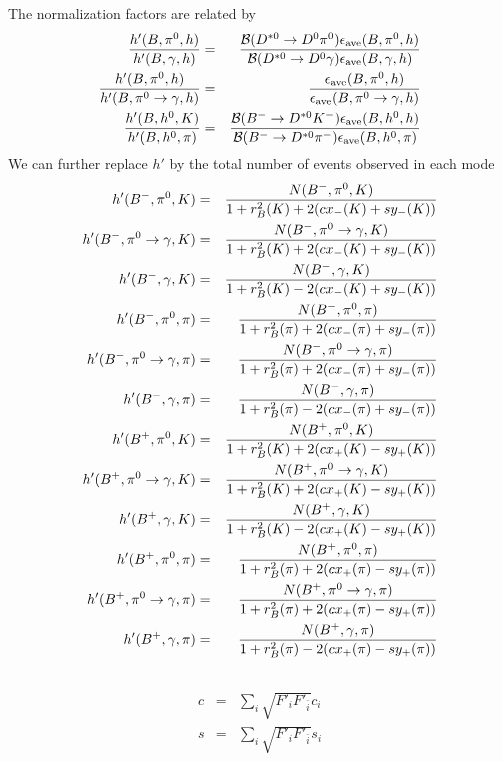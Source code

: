 The normalization factors are related by
\begin{eqnarray}
\frac{h'(B, \pi^0, h)}{h'(B, \gamma, h)} &=&\frac{{\mathcal{B}}(D^{*0} \rightarrow D^0 \pi^0) \epsilon_{\textrm{ave}}(B, \pi^0, h)}{{\mathcal{B}}(D^{*0} \rightarrow D^0 \gamma) \epsilon_{\textrm{ave}}(B, \gamma, h)} \\
\frac{h'(B, \pi^0, h)}{h'(B, \pi^0 \rightarrow \gamma, h)} &=&\frac{ \epsilon_{\textrm{ave}}(B, \pi^0, h)}{ \epsilon_{\textrm{ave}}(B, \pi^0 \rightarrow \gamma, h)} \\
\frac{h'(B, h^0, K)}{h'(B, h^0, \pi)} &=&\frac{{\mathcal{B}}(B^- \rightarrow D^{*0} K^-) \epsilon_{\textrm{ave}}(B, h^0, h)}{{\mathcal{B}}(B^- \rightarrow D^{*0} \pi^-) \epsilon_{\textrm{ave}}(B, h^0, \pi)} \\
\end{eqnarray}
We can further replace $h'$ by the total number of events observed in each mode
\begin{eqnarray}
h'({{{B}^-}}, \pi^0, K) &=& \frac{N({{{B}^-}}, \pi^0, K)}{1+r_B^2(K) + 2(c x_-(K) +  s y_-(K))}\\\nonumber 
h'({{{B}^-}}, \pi^0 \rightarrow \gamma, K) &=& \frac{N({{{B}^-}}, \pi^0 \rightarrow \gamma, K)}{1+r_B^2(K) + 2(c x_-(K) +  s y_-(K))}\\\nonumber 
h'({{{B}^-}}, \gamma, K) &=& \frac{N({{{B}^-}}, \gamma, K)}{1+r_B^2(K) - 2(c x_-(K) +  s y_-(K))}\\\nonumber 
h'({{{B}^-}}, \pi^0, \pi) &=& \frac{N({{{B}^-}}, \pi^0, \pi)}{1+r_B^2(\pi) + 2(c x_-(\pi) +  s y_-(\pi))}\\\nonumber 
h'({{{B}^-}}, \pi^0 \rightarrow \gamma, \pi) &=& \frac{N({{{B}^-}}, \pi^0 \rightarrow \gamma, \pi)}{1+r_B^2(\pi) + 2(c x_-(\pi) +  s y_-(\pi))}\\\nonumber 
h'({{{B}^-}}, \gamma, \pi) &=& \frac{N({{{B}^-}}, \gamma, \pi)}{1+r_B^2(\pi) - 2(c x_-(\pi) +  s y_-(\pi))}\\\nonumber 
h'({{{B}^+}}, \pi^0, K) &=& \frac{N({{{B}^+}}, \pi^0, K)}{1+r_B^2(K) + 2(c x_+(K) -  s y_+(K))}\\\nonumber 
h'({{{B}^+}}, \pi^0 \rightarrow \gamma, K) &=& \frac{N({{{B}^+}}, \pi^0 \rightarrow \gamma, K)}{1+r_B^2(K) + 2(c x_+(K) -  s y_+(K))}\\\nonumber 
h'({{{B}^+}}, \gamma, K) &=& \frac{N({{{B}^+}}, \gamma, K)}{1+r_B^2(K) - 2(c x_+(K) -  s y_+(K))}\\\nonumber 
h'({{{B}^+}}, \pi^0, \pi) &=& \frac{N({{{B}^+}}, \pi^0, \pi)}{1+r_B^2(\pi) + 2(c x_+(\pi) -  s y_+(\pi))}\\\nonumber 
h'({{{B}^+}}, \pi^0 \rightarrow \gamma, \pi) &=& \frac{N({{{B}^+}}, \pi^0 \rightarrow \gamma, \pi)}{1+r_B^2(\pi) + 2(c x_+(\pi) -  s y_+(\pi))}\\\nonumber 
h'({{{B}^+}}, \gamma, \pi) &=& \frac{N({{{B}^+}}, \gamma, \pi)}{1+r_B^2(\pi) - 2(c x_+(\pi) -  s y_+(\pi))}\\\nonumber 
\end{eqnarray}
\begin{eqnarray}
c &=& \sum_i \sqrt{ F'_i F'_{\bar{i}}} c_i  \\
s &=& \sum_i \sqrt{ F'_i  F'_{\bar{i}}} s_i \\
\end{eqnarray}


